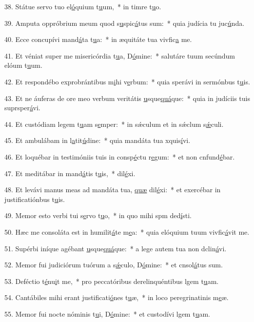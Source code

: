 38. Státue servo tuo el\uline{ó}quium t\uline{u}um,~* in timre t\uline{u}o.\par 
39. Amputa oppróbrium meum quod s\uline{u}spic\uline{á}tus sum:~* quia judícia tu juc\uline{ú}nda.\par 
40. Ecce concupívi mand\uline{á}ta t\uline{u}a:~* in æquitáte tua vivfic\uline{a} me.\par 
41. Et véniat super me misericórdia t\uline{u}a, D\uline{ó}mine:~* salutáre tuum secúndum elóum t\uline{u}um.\par 
42. Et respondébo exprobrántibus m\uline{i}hi v\uline{e}rbum:~* quia sperávi in sermónbus t\uline{u}is.\par 
43. Et ne áuferas de ore meo verbum veritátis \uline{u}sque\uline{quá}que:~* quia in judíciis tuis suprsper\uline{á}vi.\par 
44. Et custódiam legem t\uline{u}am s\uline{e}mper:~* in sǽculum et in sǽclum s\uline{ǽ}culi.\par 
45. Et ambulábam in l\uline{a}tit\uline{ú}dine:~* quia mandáta tua xquis\uline{í}vi.\par 
46. Et loquébar in testimóniis tuis in consp\uline{é}ctu r\uline{e}gum:~* et non cnfund\uline{é}bar.\par 
47. Et meditábar in mand\uline{á}tis t\uline{u}is,~*  dil\uline{é}xi.\par 
48. Et levávi manus meas ad mandáta tua, \uline{quæ} dil\uline{é}xi:~* et exercébar in justificatiónbus t\uline{u}is.\par 
49. Memor esto verbi tui s\uline{e}rvo t\uline{u}o,~* in quo mihi spm ded\uline{í}sti.\par 
50. Hæc me consoláta est in humilit\uline{á}te m\uline{e}a:~* quia elóquium tuum vivfic\uline{á}vit me.\par 
51. Supérbi iníque agébant \uline{u}sque\uline{quá}que:~* a lege autem tua non dclin\uline{á}vi.\par 
52. Memor fui judiciórum tuórum a s\uline{ǽ}culo, D\uline{ó}mine:~* et cnsol\uline{á}tus sum.\par 
53. Deféctio t\uline{é}nu\uline{i}t me,~* pro peccatóribus derelinquéntibus lgem t\uline{u}am.\par 
54. Cantábiles mihi erant justificati\uline{ó}nes t\uline{u}æ,~* in loco peregrinatinis m\uline{e}æ.\par 
55. Memor fui nocte nóminis t\uline{u}i, D\uline{ó}mine:~* et custodívi lgem t\uline{u}am.\par 
